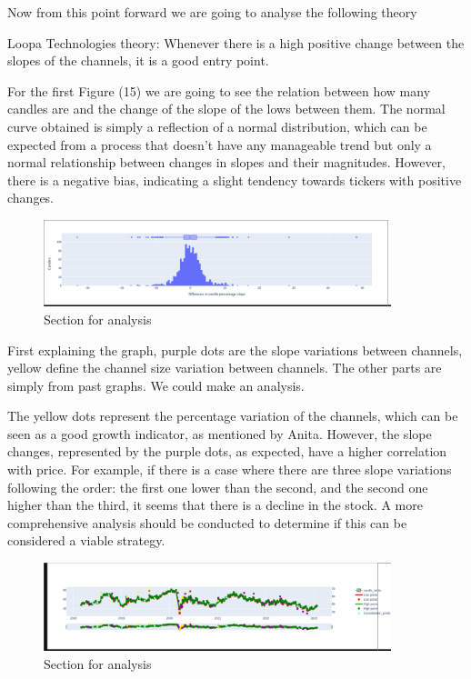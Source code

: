 \documentclass{article}
\begin{document}
Now from this point forward we are going to analyse the following theory

Loopa Technologies theory: Whenever there is a high positive change between the slopes of the channels, it is a good entry point.

For the first Figure (15) we are going to see the relation between how many
candles are and the change of the slope of the lows between them.
The normal curve obtained is simply a reflection of a normal distribution, which can be expected from a process that doesn't have any manageable trend but only a normal relationship between changes in slopes and their magnitudes. However, there is a negative bias, indicating a slight tendency towards tickers with positive changes.
\begin{figure}[h]
  \caption{Section for analysis}
  \begin{center}
    \includegraphics[width=0.9\textwidth]{figures/16.png}
  \end{center}
\end{figure}
\newpage
First explaining the graph, purple dots are the slope variations between
channels, yellow define the channel size variation between channels. The other
parts are simply from past graphs. We could make an analysis.

The yellow dots represent the percentage variation of the channels, which can be seen as a good growth indicator, as mentioned by Anita. However, the slope changes, represented by the purple dots, as expected, have a higher correlation with price. For example, if there is a case where there are three slope variations following the order: the first one lower than the second, and the second one higher than the third, it seems that there is a decline in the stock. A more comprehensive analysis should be conducted to determine if this can be considered a viable strategy.
\begin{figure}[h]
  \caption{Section for analysis}
  \begin{center}
    \includegraphics[width=0.9\textwidth]{figures/17.png}
  \end{center}
\end{figure}
\end{document}
